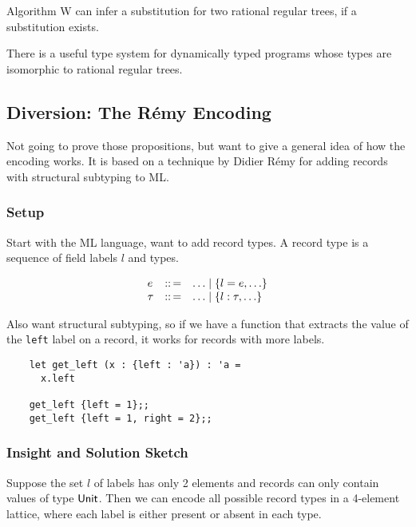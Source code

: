 \documentclass{article}
\begin{document}
\begin{proposition}
Algorithm W can infer a substitution for two rational
 regular trees, if a substitution exists.
\end{proposition}

\begin{proposition}
There is a useful type system for dynamically typed programs whose types
 are isomorphic to rational regular trees.
\end{proposition}


\subsection*{Diversion: The R\'{e}my Encoding}

Not going to prove those propositions, but want to give a general idea of how
 the encoding works.
It is based on a technique by Didier R\'{e}my for adding records with structural
 subtyping to ML.


\subsubsection*{Setup}

Start with the ML language, want to add record types.
A record type is a sequence of field labels $l$ and types.

\[\begin{array}{l c l}
  e & \coloneq & \ldots \mid \{ l = e , \ldots \}
\\\tau & \coloneq & \ldots \mid \{ l : \tau , \ldots \}
  \end{array}\]

Also want structural subtyping, so if we have a function that extracts the
value of the {\tt left} label on a record, it works for records with more
labels.

\begin{verbatim}
    let get_left (x : {left : 'a}) : 'a =
      x.left

    get_left {left = 1};;
    get_left {left = 1, right = 2};;
\end{verbatim}


\subsubsection*{Insight and Solution Sketch}

Suppose the set $l$ of labels has only 2 elements and records can only contain
 values of type $\tunit$.
Then we can encode all possible record types in a 4-element lattice, where
 each label is either present or absent in each type.
\end{document}
